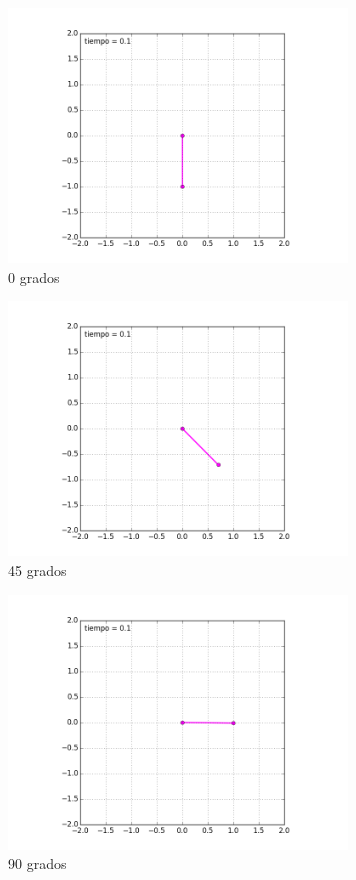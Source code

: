 \documentclass[12pt]{article}
\begin{document}
	
\begin{figure}[H]
	\centering
\includegraphics[width=9cm]{0.png}
\caption{0 grados}
\end{figure}

\begin{figure}[H]
		\centering
	\includegraphics[width=9cm]{45}
	\caption{45 grados}
\end{figure}

\begin{figure}[H]
		\centering
	\includegraphics[width=9cm]{90.png}
	\caption{90 grados}
\end{figure}
\end{document}
